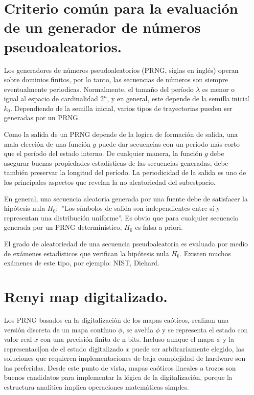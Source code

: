 \documentclass{llncs}
\begin{document}
\section{Criterio común para la evaluación de un generador de números pseudoaleatorios.}


Los generadores de números pseudoaleatorios (PRNG, siglas en inglés) operan sobre dominios finitos, por lo tanto, las secuencias de números son  siempre eventualmente periodicas. Normalmente, el tamaño del período $\lambda$ es menor o igual al espacio de cardinalidad $2^{n}$, y en general, este depende de la semilla inicial $k_{0}$. Dependiendo de la semilla inicial, varios tipos de trayectorias pueden ser generadas por un PRNG.

Como la salida de un PRNG depende de la logica de formación de salida, una mala elección de una función $g$ puede dar secuencias con un período más corto que el período del estado interno. De cualquier manera, la función $g$ debe asegurar buenas propiedades estadísticas de las secuencias generadas, debe también preservar la longitud del período. La periodicidad de la salida es uno de los principales aspectos que revelan la no aleatoriedad del subestpacio. 

En general, una secuencia aleatoria generada por una fuente debe de satisfacer la hipótesis nula $H_{0}:$  ''Los símbolos de salida son independientes entre sí y representan una distribución uniforme''. Es obvio que para cualquier secuencia generada por un PRNG determinístico, $H_{0}$ es falsa a priori.

El grado de aleatoriedad de una secuencia pseudoaleatoria es evaluada por medio de exámenes estadísticos que verifican la hipótesis nula $H_{0}$. Existen muchos exámenes de este tipo, por ejemplo: NIST, Diehard.


\section{Renyi map digitalizado.}

Los PRNG basados en la digitalización de los mapas caóticos, realizan una versión discreta de un mapa contínuo $\phi$, se avelúa $\phi$ y se representa el estado con valor real $x$ con una precisión finita de n bits. Incluso aunque el mapa $\phi$ y la representaci[on de el estado digitalizado $x$ puede ser arbitrariamente elegido, las soluciones que requieren implementaciones de baja complejidad de hardware son las preferidas. Desde este punto de vista, mapas caóticos lineales a trozos son buenos candidatos para implementar la lógica de la digitalización, porque la estructura analítica implica operaciones matemáticas simples. 
\end{document}
